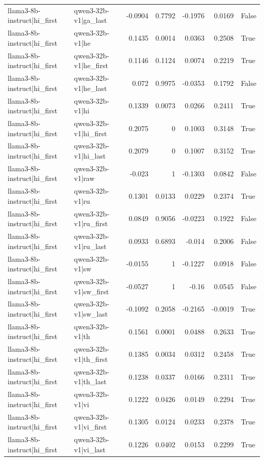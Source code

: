\begin{table}
\begin{tabular}{l l r r r r l}
llama3-8b-instruct|hi_first & qwen3-32b-v1|ga_last & -0.0904 & 0.7792 & -0.1976 & 0.0169 & False \\
llama3-8b-instruct|hi_first & qwen3-32b-v1|he & 0.1435 & 0.0014 & 0.0363 & 0.2508 & True \\
llama3-8b-instruct|hi_first & qwen3-32b-v1|he_first & 0.1146 & 0.1124 & 0.0074 & 0.2219 & True \\
llama3-8b-instruct|hi_first & qwen3-32b-v1|he_last & 0.072 & 0.9975 & -0.0353 & 0.1792 & False \\
llama3-8b-instruct|hi_first & qwen3-32b-v1|hi & 0.1339 & 0.0073 & 0.0266 & 0.2411 & True \\
llama3-8b-instruct|hi_first & qwen3-32b-v1|hi_first & 0.2075 & 0 & 0.1003 & 0.3148 & True \\
llama3-8b-instruct|hi_first & qwen3-32b-v1|hi_last & 0.2079 & 0 & 0.1007 & 0.3152 & True \\
llama3-8b-instruct|hi_first & qwen3-32b-v1|raw & -0.023 & 1 & -0.1303 & 0.0842 & False \\
llama3-8b-instruct|hi_first & qwen3-32b-v1|ru & 0.1301 & 0.0133 & 0.0229 & 0.2374 & True \\
llama3-8b-instruct|hi_first & qwen3-32b-v1|ru_first & 0.0849 & 0.9056 & -0.0223 & 0.1922 & False \\
llama3-8b-instruct|hi_first & qwen3-32b-v1|ru_last & 0.0933 & 0.6893 & -0.014 & 0.2006 & False \\
llama3-8b-instruct|hi_first & qwen3-32b-v1|sw & -0.0155 & 1 & -0.1227 & 0.0918 & False \\
llama3-8b-instruct|hi_first & qwen3-32b-v1|sw_first & -0.0527 & 1 & -0.16 & 0.0545 & False \\
llama3-8b-instruct|hi_first & qwen3-32b-v1|sw_last & -0.1092 & 0.2058 & -0.2165 & -0.0019 & True \\
llama3-8b-instruct|hi_first & qwen3-32b-v1|th & 0.1561 & 0.0001 & 0.0488 & 0.2633 & True \\
llama3-8b-instruct|hi_first & qwen3-32b-v1|th_first & 0.1385 & 0.0034 & 0.0312 & 0.2458 & True \\
llama3-8b-instruct|hi_first & qwen3-32b-v1|th_last & 0.1238 & 0.0337 & 0.0166 & 0.2311 & True \\
llama3-8b-instruct|hi_first & qwen3-32b-v1|vi & 0.1222 & 0.0426 & 0.0149 & 0.2294 & True \\
llama3-8b-instruct|hi_first & qwen3-32b-v1|vi_first & 0.1305 & 0.0124 & 0.0233 & 0.2378 & True \\
llama3-8b-instruct|hi_first & qwen3-32b-v1|vi_last & 0.1226 & 0.0402 & 0.0153 & 0.2299 & True \\

\end{tabular}
\end{table}
